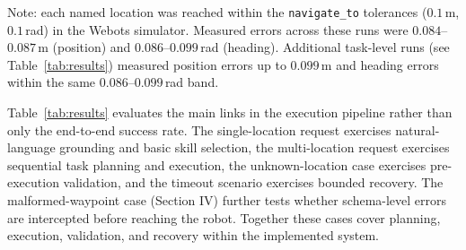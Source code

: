 \documentclass[conference]{IEEEtran}
\begin{document}
\begin{table}[t]
\centering
\caption{Navigation accuracy in the Webots simulator (Part~2).}
\label{tab:nav}
\footnotesize
{}
\par\vspace{2pt}
\footnotesize Note: each named location was reached within the
\texttt{navigate\_to} tolerances ($0.1$\,m, $0.1$\,rad) in the Webots
simulator. Measured errors across these runs were $0.084$--$0.087$\,m
(position) and $0.086$--$0.099$\,rad (heading). Additional task-level runs
(see Table~\ref{tab:results}) measured position errors up to $0.099$\,m and
heading errors within the same $0.086$--$0.099$\,rad band.
\end{table}

Table~\ref{tab:results} evaluates the main links in the execution pipeline
rather than only the end-to-end success rate. The single-location request
exercises natural-language grounding and basic skill selection, the
multi-location request exercises sequential task planning and execution, the
unknown-location case exercises pre-execution validation, and the timeout
scenario exercises bounded recovery. The malformed-waypoint case (Section
IV) further tests whether schema-level errors are intercepted before
reaching the robot. Together these cases cover planning, execution,
validation, and recovery within the implemented system.
\end{document}
